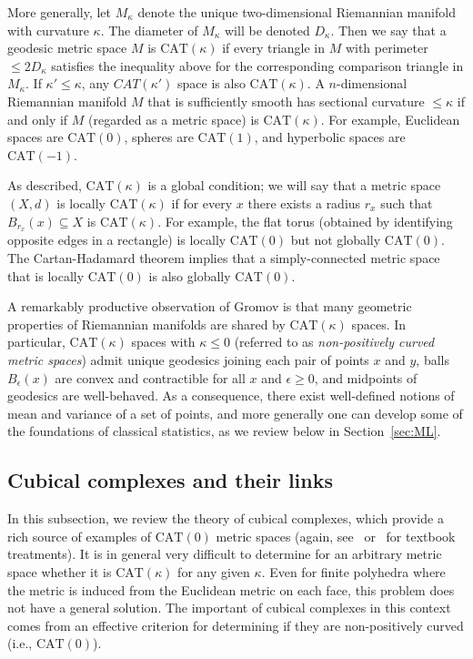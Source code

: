 \documentclass[a4paper,11pt]{article}
\newcommand{\CAT}{\textrm{CAT}}
\begin{document}
More generally, let $M_{\kappa}$ denote the unique two-dimensional Riemannian manifold with curvature $\kappa$.
The diameter of $M_{\kappa}$ will be denoted $D_{\kappa}$.
Then we say that a geodesic metric space $M$ is $\CAT(\kappa)$ if every triangle in $M$ with perimeter $\leq 2D_{\kappa}$ satisfies the inequality above for the corresponding comparison triangle in $M_{\kappa}$.
If $\kappa' \leq \kappa$, any $CAT(\kappa')$ space is also $\CAT(\kappa)$.
A $n$-dimensional Riemannian manifold $M$ that is sufficiently smooth has sectional curvature $\leq \kappa$ if and only if $M$ (regarded as a metric space) is $\CAT(\kappa)$.
For example, Euclidean spaces are $\CAT(0)$, spheres are $\CAT(1)$, and hyperbolic spaces are $\CAT(-1)$.

As described, $\CAT(\kappa)$ is a global condition; we will say that a metric space $(X,d)$ is locally $\CAT(\kappa)$ if for every $x$ there exists a radius $r_x$ such that $B_{r_x}(x) \subseteq X$ is $\CAT(\kappa)$.
For example, the flat torus (obtained by identifying opposite edges in a rectangle) is locally $\CAT(0)$ but not globally $\CAT(0)$.
The Cartan-Hadamard theorem implies that a simply-connected metric space that is locally $\CAT(0)$ is also globally $\CAT(0)$.

A remarkably productive observation of Gromov is that many geometric properties of Riemannian manifolds are shared by $\CAT(\kappa)$ spaces.
In particular, $\CAT(\kappa)$ spaces with $\kappa \leq 0$ (referred to as {\em non-positively curved metric spaces}) admit unique geodesics joining each pair of points $x$ and $y$, balls $B_{\epsilon}(x)$ are convex and contractible for all $x$ and $\epsilon \geq 0$, and midpoints of geodesics are well-behaved.
As a consequence, there exist well-defined notions of mean and variance of a set of points, and more generally one can develop some of the foundations of classical statistics, as we review below in Section~\ref{sec:ML}.

\subsection{Cubical complexes and their links}

In this subsection, we review the theory of cubical complexes, which provide a rich source of examples of $\CAT(0)$ metric spaces (again, see~\cite{burago01} or~\cite{bridson99} for textbook treatments).
It is in general very difficult to determine for an arbitrary metric space whether it is $\CAT(\kappa)$ for any given $\kappa$.
Even for finite polyhedra where the metric is induced from the Euclidean metric on each face, this problem does not have a general solution.
The important of cubical complexes in this context comes from an effective criterion for determining if they are non-positively curved (i.e., $\CAT(0)$).
\end{document}
